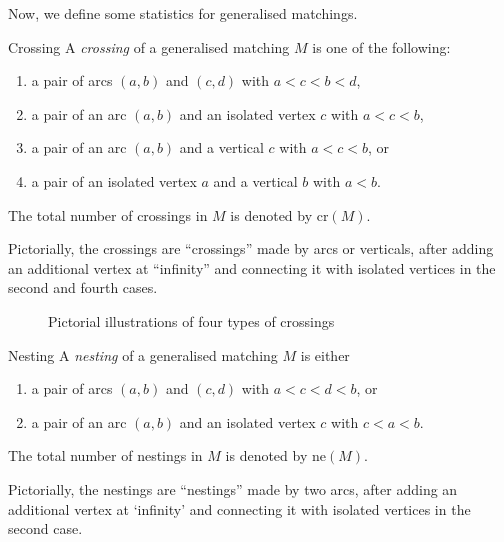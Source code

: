 \documentclass{amsart}
\theoremstyle{plain}
\theoremstyle{remark}
\numberwithin{equation}{section}
\begin{document}
\medskip 
 
Now, we define some statistics for generalised matchings. 

\begin{defn}{Crossing}
A \textit{crossing} of a generalised matching $M$ is one of the following:
\begin{enumerate}
    \item a pair of arcs $(a,b)$ and $(c,d)$ with $a<c<b<d$,   \smallskip 
    \item a pair of an arc $(a,b)$ and an isolated vertex $c$ with $a<c<b$,   \smallskip 
    \item a pair of an arc $(a,b)$ and a vertical $c$ with $a<c<b$, or   \smallskip 
    \item a pair of an isolated vertex $a$ and a vertical $b$ with $a<b$.
\end{enumerate}
The total number of crossings in $M$ is denoted by $\mathrm{cr}(M)$. 
\end{defn}
Pictorially, the crossings are ``crossings'' made by arcs or verticals, after adding an additional vertex at ``infinity'' and connecting it with isolated vertices in the second and fourth cases.

\begin{figure}[H]
\centering
{}
\caption{Pictorial illustrations of four types of crossings}
\end{figure}


\begin{defn}{Nesting} 
A \textit{nesting} of a generalised matching $M$ is either
\begin{enumerate}
    \item a pair of arcs $(a,b)$ and $(c,d)$ with $a<c<d<b$, or
      \smallskip 
    \item a pair of an arc $(a,b)$ and an isolated vertex $c$ with $c<a<b$.
\end{enumerate}
The total number of nestings in $M$ is denoted by $\mathrm{ne}(M)$.
\end{defn}
Pictorially, the nestings are ``nestings'' made by two arcs, after adding an additional vertex at `infinity' and connecting it with isolated vertices in the second case.
\end{document}
